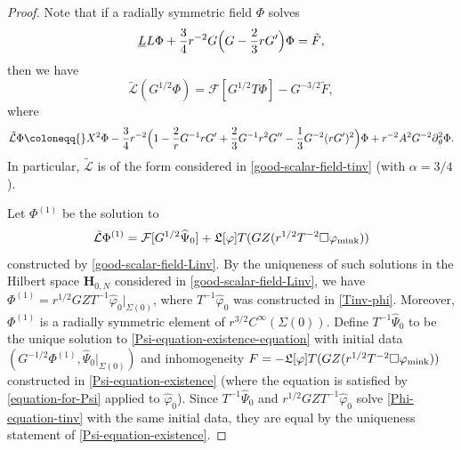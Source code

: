 \documentclass[10pt, reqno]{amsart}
\begin{document}
\begin{proof}
 Note that if a radially symmetric field
 \(\Phi{}\) solves
\begin{equation}\label{Phi-equation-tinv}
\underline{L}L\Phi{} + \frac{3}{4}r^{-2}G\Bigl(G - \frac{2}{3}rG'\Bigr)\Phi{} = \tilde{F},
\end{equation}
then we have
\begin{equation}
\tilde{\mathcal{L}}(G^{1/2}\Phi{}) = \mathcal{F}[G^{1/2}T\Phi{}] - G^{-3/2}\tilde{F},
\end{equation}
where
\begin{equation}
\tilde{\mathcal{L}}\Phi{}\coloneqq{} X^2\Phi{} - \frac{3}{4}r^{-2}\Bigl(1 - \frac{2}{r}G^{-1}rG' + \frac{2}{3}G^{-1}r^2G'' - \frac{1}{3}G^{-2}(rG')^2\Bigr)\Phi{} + r^{-2}A^2G^{-2}\partial{}_\theta^2\Phi{}.
\end{equation}
In particular, \(\tilde{\mathcal{L}}\) is of the form considered in
\cref{good-scalar-field-tinv} (with \(\alpha{} = 3/4\)).

Let \(\Phi^{(1)}\) be the solution to
\begin{equation}\label{Phi-1-construction}
\tilde{\mathcal{L}}\Phi^{(1)} = \mathcal{F}[G^{1/2}\widehat{\Psi{}}_0] + \mathfrak{L}[\varphi{}]T(GZ(r^{1/2}T^{-2}\Box{}\varphi{}_{\textnormal{mink}}))
\end{equation}
constructed by \cref{good-scalar-field-Linv}. By the uniqueness of such solutions
in the Hilbert space \(\mathbf{H}_{0,N}\) considered in
\cref{good-scalar-field-Linv}, we have \(\Phi^{(1)} =
r^{1/2}GZT^{-1}\widehat{\varphi{}}_0|_{\Sigma{}(0)}\), where
\(T^{-1}\widehat{\varphi{}}_0\) was constructed in \cref{Tinv-phi}. Moreover,
\(\Phi^{(1)}\) is a radially symmetric element of \(r^{3/2}C^\infty(\Sigma{}(0))\).
Define \(T^{-1}\widehat{\Psi{}}_0\) to be the unique solution to
\cref{Psi-equation-existence-equation} with initial data
\((G^{-1/2}\Phi^{(1)},\widehat{\Psi{}}_0|_{\Sigma{}(0)})\) and inhomogeneity \(F
=
-\mathfrak{L}[\varphi{}]T(GZ(r^{1/2}T^{-2}\Box{}\varphi{}_{\textnormal{mink}}))\)
constructed in \cref{Psi-equation-existence} (where the equation is satisfied by
\cref{equation-for-Psi} applied to \(\widehat{\varphi{}}_0\)). Since
\(T^{-1}\widehat{\Psi{}}_0\) and \(r^{1/2}GZT^{-1}\widehat{\varphi{}}_0\) solve
\cref{Phi-equation-tinv} with the same initial data, they are equal by the
uniqueness statement of \cref{Psi-equation-existence}.


\end{proof}
\end{document}
